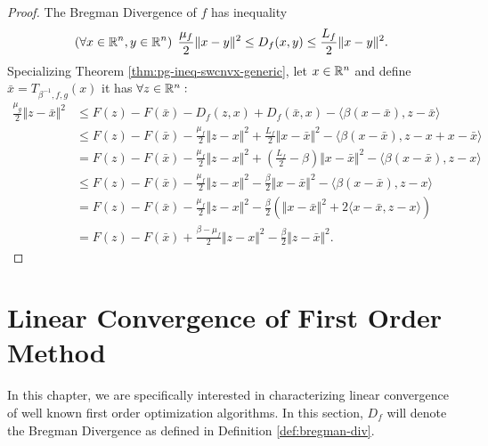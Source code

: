 \documentclass[12pt]{report}
\begin{document}
    \begin{proof}
        The Bregman Divergence of $f$ has inequality 
        \begin{align*}
            \left(\forall x \in \mathbb R^n, y \in \mathbb R^n\right)\; 
            \frac{\mu_f}{2}\Vert x - y\Vert^2 \le D_f(x, y) \le \frac{L_f}{2}\Vert x - y\Vert^2. 
        \end{align*}
        Specializing Theorem \ref{thm:pg-ineq-swcnvx-generic}, let $x \in \mathbb R^n$ and define $\bar x = T_{\beta^{-1}, f, g}(x)$ it has $\forall z \in \mathbb R^n:$
        \begin{align*}
            \frac{\mu_g}{2}\Vert z - \bar x \Vert^2 
            &\le 
            F(z) - F(\bar x) 
            - D_f(z, x) + D_f(\bar x, x) 
            - \langle \beta(x - \bar x), z - \bar x\rangle
            \\
            &\le 
            F(z) - F(\bar x) 
            - \frac{\mu_f}{2}\Vert z - x\Vert^2 
            + \frac{L_f}{2}\Vert x - \bar x\Vert^2
            - \langle \beta(x - \bar x), z - x + x - \bar x\rangle
            \\
            &= 
            F(z) - F(\bar x) 
            - \frac{\mu_f}{2}\Vert z - x\Vert^2 
            + \left(
                \frac{L_f}{2} - \beta
            \right)\Vert x - \bar x\Vert^2
            - \langle \beta(x - \bar x), z - x\rangle
            \\
            &\le 
            F(z) - F(\bar x) 
            - \frac{\mu_f}{2}\Vert z - x\Vert^2 
            - \frac{\beta}{2}\Vert x - \bar x\Vert^2
            - \langle \beta(x - \bar x), z - x\rangle
            \\
            &= 
            F(z) - F(\bar x) 
            - \frac{\mu_f}{2}\Vert z - x\Vert^2 
            - \frac{\beta}{2}
            \left(
                \Vert x - \bar x\Vert^2
                + 2\langle x - \bar x, z - x\rangle
            \right)
            \\
            &= 
            F(z) - F(\bar x) 
            + \frac{\beta - \mu_f}{2}\Vert z - x\Vert^2 
            - \frac{\beta}{2}\Vert z - \bar x\Vert^2. 
        \end{align*}
    \end{proof}
    
\chapter{Linear Convergence of First Order Method}
    In this chapter, we are specifically interested in characterizing linear convergence of well known first order optimization algorithms. 
    In this section, $D_f$ will denote the Bregman Divergence as defined in Definition \ref{def:bregman-div}. 
\end{document}
